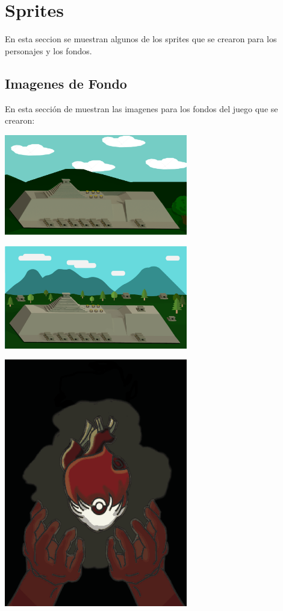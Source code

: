 \section{Sprites}
En esta seccion se muestran algunos de los sprites que se crearon para los 
personajes y los fondos. 
\subsection{Imagenes de Fondo}
En esta sección de muestran las imagenes para los fondos del juego que se crearon:
\\
\par
\begin{center}
\includegraphics[width=0.6\textwidth]{09Anexos/sprites/fondo02}
\end{center}

\begin{center}
\includegraphics[width=0.6\textwidth]{09Anexos/sprites/fondo-Mont}
\end{center}

\begin{center}
\includegraphics[width=0.6\textwidth]{09Anexos/sprites/yolotl_logo}
\end{center}

